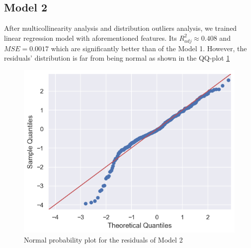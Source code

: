 \documentclass[12pt, bachelor, substylefile = algo_title.rtx]{disser}
\theoremstyle{definition}
\begin{document}
\subsection{Model 2}
After multicollinearity analysis and distribution outliers analysis, we trained linear regression model with aforementioned features. Its $R^2_{adj} \approx 0.408$ and $MSE = 0.0017$ which are significantly better than of the Model 1. However, the residuals' distribution is far from being normal as shown in the QQ-plot \ref{fig: 12} 
\begin{figure}[!h]
\centering
   \begin{minipage}{0.7\textwidth}
     \includegraphics[width=\linewidth]{resqq2}
   \end{minipage}
\caption{Normal probability plot for the residuals of Model 2}
\label{fig: 12}
\end{figure}
\end{document}
